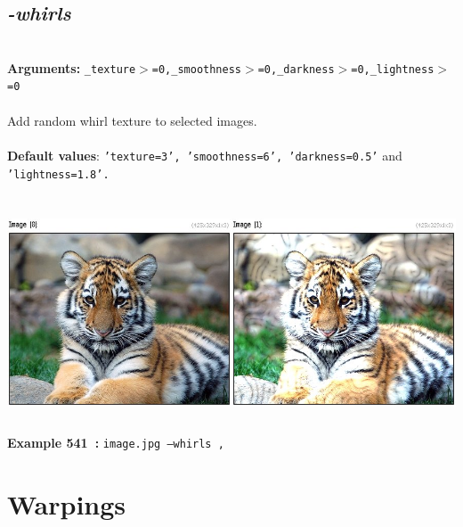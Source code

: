 \documentclass[a4paper,11pt,twoside]{book}
\begin{document}
\subsection{\emph{-whirls} }\vspace*{-0.5em}
~\\\textbf{Arguments: } 
{\small \texttt{\_texture$>$=0,\_smoothness$>$=0,\_darkness$>$=0,\_lightness$>$=0}}\\~\\
Add random whirl texture to selected images.
~\\~\\\textbf{Default values}: {\small \texttt{'texture=3', 'smoothness=6', 'darkness=0.5'} and \texttt{'lightness=1.8'.}}
\begin{center}\includegraphics[keepaspectratio=true,height=7cm,width=\textwidth]{img/gmic_def541.jpg}\\
{\footnotesize \textbf{Example 541~:} \texttt{image.jpg --whirls ,}}
\end{center}
\section{Warpings}
\end{document}
